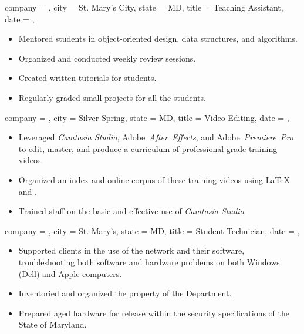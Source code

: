 \documentclass{bettercv}
\newcommand \software[1] {\textsl{#1}}
\begin{document}
\begin{position}
  {
    company = \smcmmathcs,
    city    = St. Mary's City,
    state   = MD,
    title   = Teaching Assistant,
    date    = ,
  }

\begin{itemize}
\item Mentored students in object-oriented design, data structures, and algorithms.
\item Organized and conducted weekly review sessions.
\item Created written tutorials for students.
\item Regularly graded small projects for all the students.
\end{itemize}
\end{position}

\begin{position}
  {
    company = \cwc,
    city    = Silver Spring,
    state   = MD,
    title   = Video Editing,
    date    = ,
  }

\begin{itemize}
\item Leveraged \software{Camtasia Studio},
  Adobe~\software{After~Effects}, and
  Adobe~\software{Premiere~Pro} to edit, master, and produce
  a curriculum of professional-grade training videos.
\item Organized an index and online corpus of these training videos using \LaTeX{} and \mindflash.
\item Trained staff on the basic and effective use of \software{Camtasia Studio}.
\end{itemize}
\end{position}

\begin{position}
  {
    company = \smcmoit,
    city    = St. Mary's,
    state   = MD,
    title   = Student Technician,
    date    = ,
  }

\begin{itemize}
\item Supported clients in the use of the network and their software,
  troubleshooting both software and hardware problems on both Windows (Dell) and Apple computers.
\item Inventoried and organized the property of the Department.
\item Prepared aged hardware for release within the security specifications of the State of Maryland.
\end{itemize}
\end{position}
\end{document}
